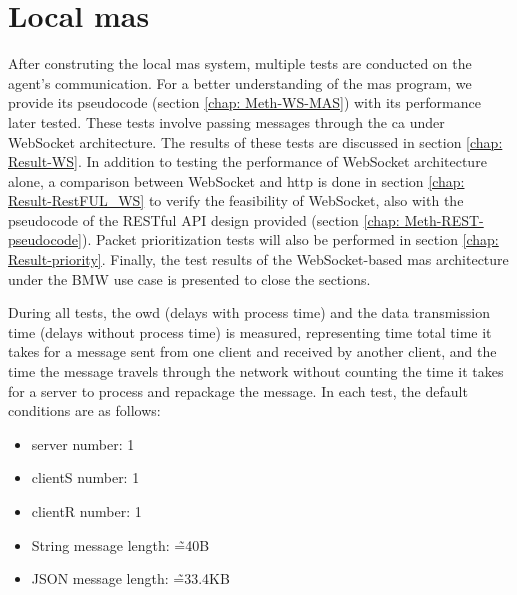 \section{Local \gls{mas}}\label{chap: Result-Internal}
After construting the local \gls{mas} system, multiple tests are conducted on the 
agent's communication. For a better understanding of the \gls{mas} program, we 
provide its pseudocode (section \ref{chap: Meth-WS-MAS}) with its performance later tested. These tests involve 
passing messages through the \gls{ca} under 
WebSocket architecture. The results of these tests are discussed in 
section \ref{chap: Result-WS}. In addition to testing the performance of WebSocket 
architecture alone, a comparison between WebSocket and \gls{http} is done in 
section \ref{chap: Result-RestFUL_WS} to verify 
the feasibility of WebSocket, also with the pseudocode of the RESTful API design 
provided (section \ref{chap: Meth-REST-pseudocode}). Packet prioritization tests will also be performed in 
section \ref{chap: Result-priority}. Finally, the test results of the 
WebSocket-based \gls{mas} architecture under the BMW use case is presented to 
close the sections. 





During all tests, the \gls{owd} (delays with process time) and 
the data transmission time (delays without process time) is measured, representing 
time total time it takes for a message sent from one client and received by another client, 
and the time the message travels through the network without counting the time 
it takes for a server to process and repackage the message. In each test, the 
default conditions are as follows: 

\begin{itemize}
    \item server number: 1
    \item clientS number: 1
    \item clientR number: 1
    \item String message length: \~=40B
    \item JSON message length: \~=33.4KB
\end{itemize}


